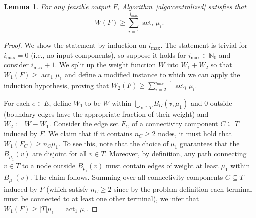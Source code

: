 \documentclass[letterpaper,11pt]{article}
\newtheorem{lemma}[theorem]{Lemma}
\newcommand{\namedref}[2]{\hyperref[#2]{#1~\ref*{#2}}}
\newcommand{\algref}[1]{\namedref{Algorithm}{#1}}
\newcommand{\N}{\mathbb{N}}
\DeclareMathOperator{\act}{act}
\begin{document}
\begin{lemma}\label{lemma:cost} 
For any feasible output $F$, \algref{algo:centralized} satisfies that
\begin{equation*}
W(F)\geq \sum_{i=1}^{i_{\max}}\act_i\mu_i.
\end{equation*}
\end{lemma}
\begin{proof}
We show the statement by induction on $i_{\max}$. The statement is trivial for
$i_{\max}=0$ (i.e., no input components), so suppose it holds for
$i_{\max}\in \N_0$ and consider $i_{\max}+1$. We split up the weight function
$W$ into $W_1+W_2$ so that $W_1(F)\geq \act_1\mu_1$ and define a modified
instance to which we can apply the induction hypothesis, proving that $W_2(F)\geq
\sum_{i=2}^{i_{\max}+1}\act_i\mu_i$.

For each $e\in E$, define $W_1$ to be $W$ within $\bigcup_{v\in T}
B_G(v,\mu_1)$ and $0$ outside (boundary edges have the appropriate fraction of
their weight) and $W_2:=W-W_1$. Consider the edge set $F_C$ of a connectivity
component $C\subseteq T$ induced by $F$. We claim that if it contains $n_C\geq
2$ nodes, it must hold that $W_1(F_C)\geq n_C\mu_1$. To see this, note that the
choice of $\mu_1$ guarantees that the $B_{\mu_1}(v)$ are disjoint for all
$v\in T$. Moreover, by definition, any path connecting $v\in T$ to a node
outside $B_{\mu_1}(v)$ must contain edges of weight at least $\mu_1$ within
$B_{\mu_1}(v)$. The claim follows. Summing over all connectivity components
$C\subseteq T$ induced by $F$ (which satisfy $n_C\geq 2$ since by the problem
definition each terminal must be connected to at least one other terminal), we
infer that $W_1(F)\geq |T|\mu_1=\act_1\mu_1$.


\end{proof}
\end{document}
